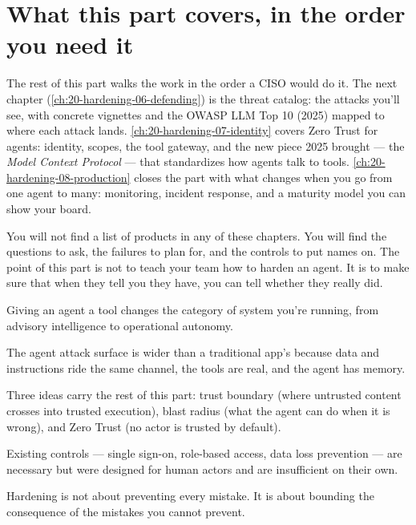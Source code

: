 \section{What this part covers, in the order you need it}

The rest of this part walks the work in the order a CISO would do it. The next chapter (\autoref{ch:20-hardening-06-defending}) is the threat catalog: the attacks you'll see, with concrete vignettes and the OWASP LLM Top 10 (2025) mapped to where each attack lands. \autoref{ch:20-hardening-07-identity} covers Zero Trust for agents: identity, scopes, the tool gateway, and the new piece 2025 brought --- the \textit{Model Context Protocol} --- that standardizes how agents talk to tools. \autoref{ch:20-hardening-08-production} closes the part with what changes when you go from one agent to many: monitoring, incident response, and a maturity model you can show your board.

You will not find a list of products in any of these chapters. You will find the questions to ask, the failures to plan for, and the controls to put names on. The point of this part is not to teach your team how to harden an agent. It is to make sure that when they tell you they have, you can tell whether they really did.

\TNrule

\stoptwocol

\begin{TNkeytakeaways}
\item Giving an agent a tool changes the category of system you're running, from advisory intelligence to operational autonomy.
\item The agent attack surface is wider than a traditional app's because data and instructions ride the same channel, the tools are real, and the agent has memory.
\item Three ideas carry the rest of this part: trust boundary (where untrusted content crosses into trusted execution), blast radius (what the agent can do when it is wrong), and Zero Trust (no actor is trusted by default).
\item Existing controls --- single sign-on, role-based access, data loss prevention --- are necessary but were designed for human actors and are insufficient on their own.
\item Hardening is not about preventing every mistake. It is about bounding the consequence of the mistakes you cannot prevent.
\end{TNkeytakeaways}

